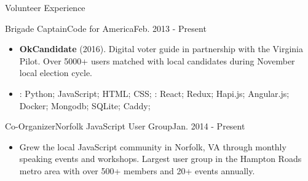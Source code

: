 \documentclass[]{mcdowellcv}
\begin{document}
    \begin{cvsection}{Volunteer Experience}
        \begin{cvsubsection}{Brigade Captain}{Code for America}{Feb. 2013 - Present}
            \begin{itemize}
                \item \textbf{OkCandidate} (2016). Digital voter guide in partnership with the Virginia Pilot. Over 5000+ users matched with local candidates during November local election cycle.
            \end{itemize}
            \begin{itemize}
                 \item {}:  Python; JavaScript; HTML; CSS; \newline
                : React; Redux; Hapi.js; Angular.js; Docker; Mongodb; SQLite; Caddy;
            \end{itemize}

        \end{cvsubsection}

        \begin{cvsubsection}{Co-Organizer}{Norfolk JavaScript User Group}{Jan. 2014 - Present}
            \begin{itemize}
                \item Grew the local JavaScript community in Norfolk, VA through monthly speaking events and workshops. Largest user group in the Hampton Roads metro area with over 500+ members and 20+ events annually.
            \end{itemize}
        \end{cvsubsection}
    \end{cvsection}
\end{document}
